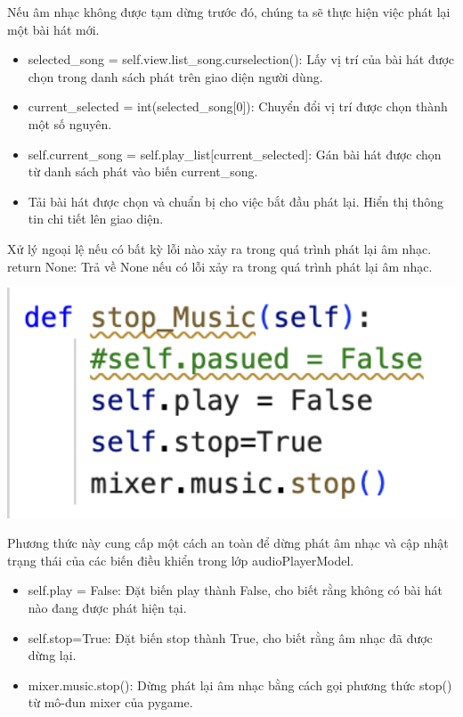 \documentclass[a4paper]{article}
\begin{document}
\hspace*{0.5} Nếu âm nhạc không được tạm dừng trước đó, chúng ta sẽ thực hiện việc phát lại một bài hát mới.
\begin{itemize}
    \item selected\_song = self.view.list\_song.curselection(): Lấy vị trí của bài hát được chọn trong danh sách phát trên giao diện người dùng.
    \item current\_selected = int(selected\_song[0]): Chuyển đổi vị trí được chọn thành một số nguyên.
    \item self.current\_song = self.play\_list[current\_selected]: Gán bài hát được chọn từ danh sách phát vào biến current\_song.
    \item Tải bài hát được chọn và chuẩn bị cho việc bắt đầu phát lại. Hiển thị thông tin chi tiết lên giao diện.
\end{itemize}

\hspace*{0.5} Xử lý ngoại lệ nếu có bất kỳ lỗi nào xảy ra trong quá trình phát lại âm nhạc. return None: Trả về None nếu có lỗi xảy ra trong quá trình phát lại âm nhạc.

\begin{center}
\includegraphics[width=175mm]{template_SGU 2/audio_stop.png}
\end{center}

\hspace*{0.5} Phương thức này cung cấp một cách an toàn để dừng phát âm nhạc và cập nhật trạng thái của các biến điều khiển trong lớp audioPlayerModel.

\begin{itemize}
    \item self.play = False: Đặt biến play thành False, cho biết rằng không có bài hát nào đang được phát hiện tại.
    \item self.stop=True: Đặt biến stop thành True, cho biết rằng âm nhạc đã được dừng lại.
    \item mixer.music.stop(): Dừng phát lại âm nhạc bằng cách gọi phương thức stop() từ mô-đun mixer của pygame.
\end{itemize}
\end{document}
